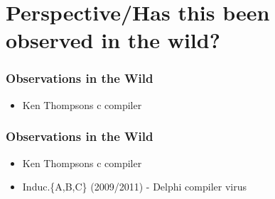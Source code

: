 \section{Perspective/Has this been observed in the wild?}

\begin{frame}
  \frametitle{Observations in the Wild}
%
  \begin{itemize}
  \item Ken Thompsons c compiler
  \end{itemize}
%
\end{frame}

\begin{frame}
  \frametitle{Observations in the Wild}
%
  \begin{itemize}
  \item Ken Thompsons c compiler
  \item Induc.\{A,B,C\} (2009/2011) - Delphi compiler virus
  \end{itemize}
%
\end{frame}
